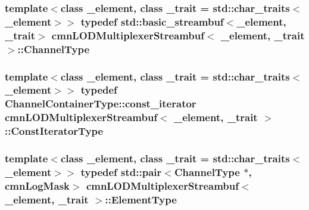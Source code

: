 \subsubsection[{Channel\+Type}]{\setlength{\rightskip}{0pt plus 5cm}template$<$class \+\_\+element, class \+\_\+trait = std\+::char\+\_\+traits$<$\+\_\+element$>$$>$ typedef std\+::basic\+\_\+streambuf$<$\+\_\+element, \+\_\+trait$>$ {\bf cmn\+L\+O\+D\+Multiplexer\+Streambuf}$<$ \+\_\+element, \+\_\+trait $>$\+::{\bf Channel\+Type}}\label{classcmn_l_o_d_multiplexer_streambuf_aa3b0347701c1aa5157a719978a1a6386}
\hypertarget{classcmn_l_o_d_multiplexer_streambuf_ad60c91a0708ddcaf266d48f09d37bb63}{}
\subsubsection[{Const\+Iterator\+Type}]{\setlength{\rightskip}{0pt plus 5cm}template$<$class \+\_\+element, class \+\_\+trait = std\+::char\+\_\+traits$<$\+\_\+element$>$$>$ typedef Channel\+Container\+Type\+::const\+\_\+iterator {\bf cmn\+L\+O\+D\+Multiplexer\+Streambuf}$<$ \+\_\+element, \+\_\+trait $>$\+::{\bf Const\+Iterator\+Type}}\label{classcmn_l_o_d_multiplexer_streambuf_ad60c91a0708ddcaf266d48f09d37bb63}
\hypertarget{classcmn_l_o_d_multiplexer_streambuf_ac397e28a9605093b41ec53ac52eefef5}{}
\subsubsection[{Element\+Type}]{\setlength{\rightskip}{0pt plus 5cm}template$<$class \+\_\+element, class \+\_\+trait = std\+::char\+\_\+traits$<$\+\_\+element$>$$>$ typedef std\+::pair$<${\bf Channel\+Type} $\ast$, {\bf cmn\+Log\+Mask}$>$ {\bf cmn\+L\+O\+D\+Multiplexer\+Streambuf}$<$ \+\_\+element, \+\_\+trait $>$\+::{\bf Element\+Type}}\label{classcmn_l_o_d_multiplexer_streambuf_ac397e28a9605093b41ec53ac52eefef5}
\hypertarget{classcmn_l_o_d_multiplexer_streambuf_a8d1eadc5cf72b594aa2c2fef6401fe47}{}
